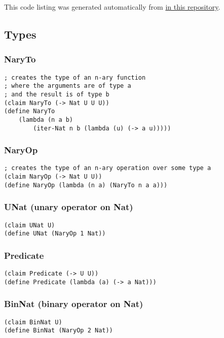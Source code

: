This code listing was generated automatically from \href{https://github.com/thechosenreader/The-Little-Typer-Notes}{ in this repository}.
\subsection{Types}

\subsubsection{NaryTo} \label{code:NaryTo}
\begin{verbatim}
; creates the type of an n-ary function
; where the arguments are of type a
; and the result is of type b
(claim NaryTo (-> Nat U U U))
(define NaryTo
    (lambda (n a b)
        (iter-Nat n b (lambda (u) (-> a u)))))
\end{verbatim}

\subsubsection{NaryOp} \label{code:NaryOp}
\begin{verbatim}
; creates the type of an n-ary operation over some type a
(claim NaryOp (-> Nat U U))
(define NaryOp (lambda (n a) (NaryTo n a a)))
\end{verbatim}

\subsubsection{UNat (unary operator on Nat)} \label{code:UNat}
\begin{verbatim}
(claim UNat U)
(define UNat (NaryOp 1 Nat))
\end{verbatim}

\subsubsection{Predicate} \label{code:Predicate}
\begin{verbatim}
(claim Predicate (-> U U))
(define Predicate (lambda (a) (-> a Nat)))
\end{verbatim}

\subsubsection{BinNat (binary operator on Nat)} \label{code:BinNat}
\begin{verbatim}
(claim BinNat U)
(define BinNat (NaryOp 2 Nat))
\end{verbatim}


